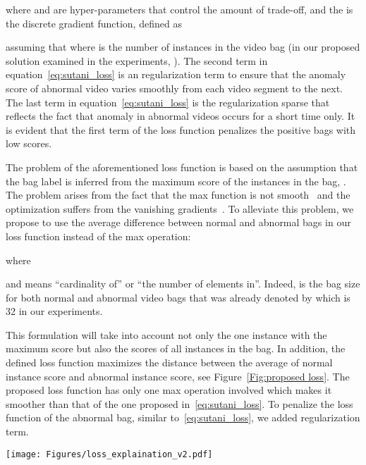 \documentclass[journal]{IEEEtran}
\begin{document}
where  and  are hyper-parameters that control the amount of trade-off, and the  is the discrete gradient function, defined as

assuming that  where  is the number of instances in the video bag (in our proposed solution examined in the experiments, ).
The second term in equation~\eqref{eq:sutani_loss} is an  regularization term to ensure that the anomaly score of abnormal video varies smoothly from each video segment to the next. The last term in equation~\eqref{eq:sutani_loss} is the  regularization sparse that reflects the fact that anomaly in abnormal videos occurs for a short time only. It is evident that the first term of the loss function penalizes the positive bags with low scores.

The problem of the aforementioned loss function is based on the assumption that the bag label is inferred from the maximum score of the instances in the bag, . The problem arises from the fact that the max function is not smooth~\cite{hu2008multiple} and the optimization suffers from the vanishing gradients~\cite{ilse2018attention}. To alleviate this problem, we propose to use the average difference between normal and abnormal bags in our loss function instead of the max operation:


where



and  means ``cardinality of'' or ``the number of elements in''. Indeed,  is the bag size for both normal and abnormal video bags that was already denoted by  which is 32 in our experiments.

This formulation will take into account not only the one instance with the maximum score but also the scores of all instances in the bag.  In addition, the defined loss function maximizes the distance between the average of normal instance score and abnormal instance score, see Figure~\ref{Fig:proposed loss}.
The proposed loss function has only one max operation involved which makes it smoother than that of the one proposed in~\eqref{eq:sutani_loss}. To penalize the loss function of the abnormal bag, similar to~\eqref{eq:sutani_loss}, we added  regularization term.\\
\begin{figure*}
\centering
	\texttt{[image: Figures/loss\_explaination\_v2.pdf]}
	\caption{The proposed loss function use the mean distance  between abnormal bag instances score and normal bag instances score. To ensure the abnormal bag always has a higher mean score, we penalize  when it is negative.}
	\label{Fig:proposed loss}
\end{figure*}
\end{document}
